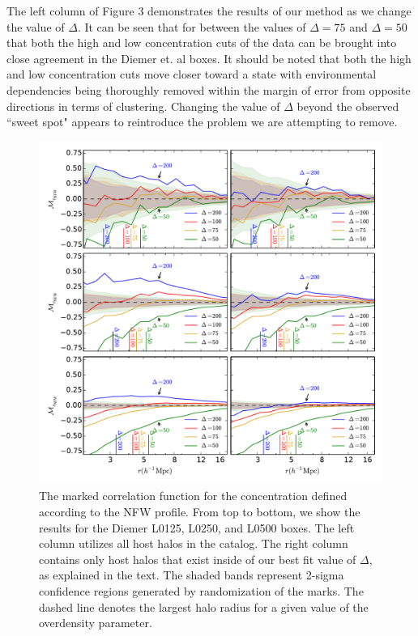 \documentclass[usenatbib,usegraphicx,letterpaper]{mn2e}
\begin{document}

The left column of Figure 3 demonstrates the results of our method as we change the value of $\Delta$. It can be seen that for between the values of $\Delta = 75$ and $\Delta = 50$ that both the high and low concentration cuts of the data can be brought into close agreement in the Diemer et. al boxes. It should be noted that both the high and low concentration cuts move closer toward a state with environmental dependencies being thoroughly removed within the margin of error from opposite directions in terms of clustering. Changing the value of $\Delta$ beyond the observed ``sweet spot" appears to reintroduce the problem we are attempting to remove.

\begin{figure}
	\centering
	\includegraphics[width=\textwidth]{all_mcf_cnfw_z00_hostsvmatch.pdf}
	\caption{The marked correlation function for the concentration defined according to the NFW profile. From top to bottom, we show the results for the Diemer L0125, L0250, and L0500 boxes. The left column utilizes all host halos in the catalog. The right column contains only host halos that exist inside of our best fit value of $\Delta$, as explained in the text. The shaded bands represent 2-sigma confidence regions generated by randomization of the marks. The dashed line denotes the largest halo radius for a given value of the overdensity parameter.}
\end{figure}
\end{document}
